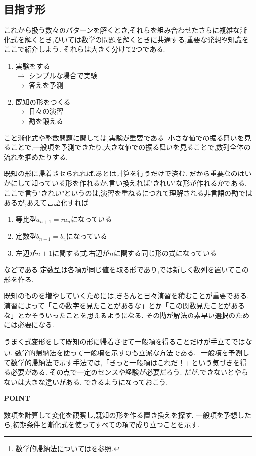 \subsection{目指す形}\label{節：目指す形}
  これから扱う数々のパターンを解くとき,それらを組み合わせたさらに複雑な漸化式を解くとき,ひいては数学の問題を解くときに共通する,重要な発想や知識をここで紹介しよう.
  それらは大きく分けて2つである.
  \begin{enumerate}
    \item 実験をする\\
          $\rightarrow$ シンプルな場合で実験\\
          $\rightarrow$ 答えを予測
    \item 既知の形をつくる\\
          $\rightarrow$ 日々の演習\\
          $\rightarrow$ 勘を鍛える
  \end{enumerate}
  こと漸化式や整数問題に関しては,実験が重要である.
  小さな値での振る舞いを見ることで,一般項を予測できたり,大きな値での振る舞いを見ることで,数列全体の流れを掴めたりする.
  
  既知の形に帰着させられれば,あとは計算を行うだけで済む.
  だから重要なのはいかにして知っている形を作れるか,言い換えれば"きれい"な形が作れるかである.
  ここで言う"きれい"というのは,演習を重ねるにつれて理解される非言語の勘ではあるが,あえて言語化すれば
  \begin{enumerate}
    \item 等比型$a_{n+1}=ra_n$になっている
    \item 定数型$b_{n+1}=b_n$になっている
    \item 左辺が$n+1$に関する式,右辺が$n$に関する同じ形の式になっている
  \end{enumerate}
  などである.定数型は各項が同じ値を取る形であり,では新しく数列を置いてこの形を作る.
  
  既知のものを増やしていくためには,きちんと日々演習を積むことが重要である.
  演習によって「この数字を見たことがあるな」とか「この関数見たことがあるな」とかそういったことを思えるようになる.
  その勘が解法の素早い選択のためには必要になる.

  うまく式変形をして既知の形に帰着させて一般項を得ることだけが手立てではない.
  数学的帰納法を使って一般項を示すのも立派な方法である.\footnote{数学的帰納法についてはを参照.}
  一般項を予測して数学的帰納法で示す手法では,「きっと一般項はこれだ！」という気づきを得る必要がある.
  その点で一定のセンスや経験が必要だろう.
  だが,できないとやらないは大きな違いがある.
  できるようになっておこう.

  \begin{bookpoint}
    \textbf{POINT}\par
    数項を計算して変化を観察し,既知の形を作る置き換えを探す.
    一般項を予想したら,初期条件と漸化式を使ってすべての項で成り立つことを示す.
  \end{bookpoint}
